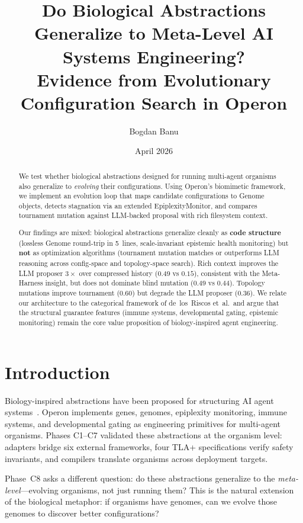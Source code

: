 \documentclass[11pt]{article}
\title{Do Biological Abstractions Generalize to Meta-Level AI Systems Engineering?\\
\large Evidence from Evolutionary Configuration Search in Operon}
\author{Bogdan Banu}
\date{April 2026}
\begin{document}
\maketitle

\begin{abstract}
We test whether biological abstractions designed for running multi-agent
organisms also generalize to \emph{evolving} their configurations.
Using Operon's biomimetic framework, we implement an evolution loop that
maps candidate configurations to Genome objects, detects stagnation via
an extended EpiplexityMonitor, and compares tournament mutation against
LLM-backed proposal with rich filesystem context.

Our findings are mixed: biological abstractions generalize cleanly as
\textbf{code structure} (lossless Genome round-trip in 5~lines,
scale-invariant epistemic health monitoring) but \textbf{not} as
optimization algorithms (tournament mutation matches or outperforms LLM
reasoning across config-space and topology-space search). Rich context
improves the LLM proposer $3\times$ over compressed history ($0.49$ vs
$0.15$), consistent with the Meta-Harness insight, but does not dominate
blind mutation ($0.49$ vs $0.44$). Topology mutations improve tournament
($0.60$) but degrade the LLM proposer ($0.36$). We relate our
architecture to the categorical framework of de~los~Riscos et~al.\ and
argue that the structural guarantee features (immune systems,
developmental gating, epistemic monitoring) remain the core value
proposition of biology-inspired agent engineering.
\end{abstract}

\section{Introduction}

Biology-inspired abstractions have been proposed for structuring AI agent
systems~\cite{banu2026operon}. Operon implements genes, genomes,
epiplexity monitoring, immune systems, and developmental gating as
engineering primitives for multi-agent organisms. Phases C1--C7 validated
these abstractions at the organism level: adapters bridge six external
frameworks, four TLA+ specifications verify safety invariants, and
compilers translate organisms across deployment targets.

Phase~C8 asks a different question: do these abstractions generalize to
the \emph{meta-level}---evolving organisms, not just running them? This
is the natural extension of the biological metaphor: if organisms have
genomes, can we evolve those genomes to discover better configurations?
\end{document}
